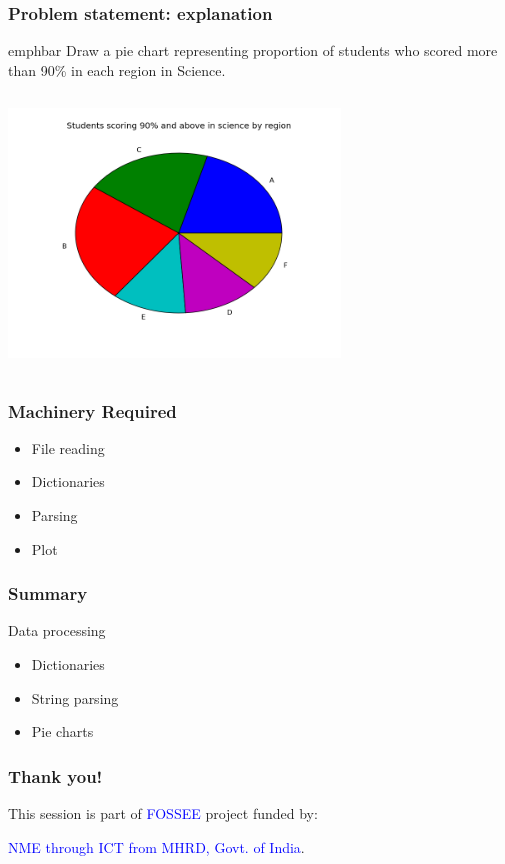 \documentclass[14pt,compress]{beamer}
\newcommand{\emphbar}[1]
{\begin{beamercolorbox}[rounded=true]{emphbar} 
      {#1}
 \end{beamercolorbox}
}
\begin{document}
\begin{frame}
  \frametitle{Problem statement: explanation}
    \emphbar{Draw a pie chart representing proportion of students who scored more than 90\% in each region in Science.}
    \begin{columns}
    \hspace*{.5in}
    \includegraphics[height=2.6in, interpolate=true]{data/science}
\end{columns}
\end{frame}

\begin{frame}
  \frametitle{Machinery Required}
  \begin{itemize}
    \item File reading 
    \item Dictionaries 
    \item Parsing 
    \item Plot 
  \end{itemize}
\end{frame}

\begin{frame}[fragile]
  \frametitle{Summary}
  \begin{block}{Data processing}
    \begin{itemize}
    \item Dictionaries
    \item String parsing
    \item Pie charts
    \end{itemize}  
  \end{block}
\end{frame}

\begin{frame}
  \frametitle{Thank you!}  
  \begin{block}{}
  This session is part of \textcolor{blue}{FOSSEE} project funded by:
  \begin{center}
    \textcolor{blue}{NME through ICT from MHRD, Govt. of India}.
  \end{center}  
  \end{block}
\end{frame}
\end{document}
